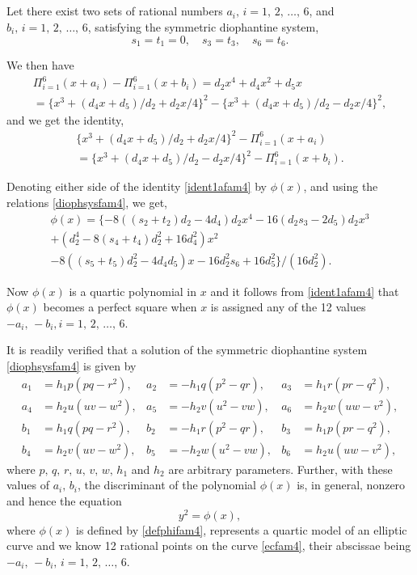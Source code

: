 \documentclass[11pt, leqno]{article}
\begin{document}
\subsection{}
Let  there exist two sets of rational numbers $a_i,\,i=1,\,2,\,\ldots,\,6$, and $b_i,\,i=1,\,2,\,\ldots,\,6$, satisfying the symmetric diophantine system,
\begin{equation}
s_1=t_1=0,\quad s_3=t_3, \quad s_6=t_6. \label{diophsysfam4}
\end{equation}

We then have
\begin{multline}
\Pi_{i=1}^6(x+a_i)-\Pi_{i=1}^6(x+b_i)=d_2x^4+d_4x^2+d_5x\\
=\{x^3+(d_4x+d_5)/d_2+d_2x/4\}^2-\{x^3+(d_4x+d_5)/d_2-d_2x/4\}^2,\label{ident1fam4}
\end{multline}
and we get the identity,
\begin{multline}
\{x^3+(d_4x+d_5)/d_2+d_2x/4\}^2-\Pi_{i=1}^6(x+a_i)\\
=\{x^3+(d_4x+d_5)/d_2-d_2x/4\}^2-\Pi_{i=1}^6(x+b_i).\label{ident1afam4}
\end{multline}

Denoting either side of the identity \eqref{ident1afam4} by $\phi(x)$, and using the relations \eqref{diophsysfam4}, we get,
\begin{multline}
\phi(x)=\{-8((s_2+t_2)d_2-4d_4)d_2x^4-16(d_2s_3-2d_5)d_2x^3\\
+(d_2^4-8(s_4+t_4)d_2^2+16d_4^2)x^2 \quad \\
-8((s_5+t_5)d_2^2-4d_4d_5)x-16d_2^2s_6+16d_5^2\}/(16d_2^2). \label{defphifam4}
\end{multline}

Now $\phi(x)$ is a quartic polynomial in $x$ and it follows from \eqref{ident1afam4} that $\phi(x)$ becomes a perfect square when $x$ is assigned any of the 12 values $-a_i, \, -b_i, i=1,\,2,\,\ldots,\,6$.

It is readily verified that a solution of the symmetric diophantine system \eqref{diophsysfam4} is given by 
\begin{equation}
\begin{aligned}
a_1 &= h_1p(pq-r^2),  & a_2 &= -h_1q(p^2-qr),  & a_3 &= h_1r(pr-q^2),   \\
a_4 &= h_2u(uv-w^2),  & a_5 &= -h_2v(u^2-vw),  & a_6 &= h_2w(uw-v^2),  \\
b_1 &= h_1q(pq-r^2),  & b_2 &= -h_1r(p^2-qr),  & b_3 &= h_1p(pr-q^2),  \\
 b_4 &= h_2v(uv-w^2),  & b_5 &= -h_2w(u^2-vw),  & b_6 &= h_2u(uw-v^2),  
\end{aligned} \label{valabfam4}
\end{equation}
where $p,\,q,\,r,\,u,\,v,\,w,\,h_1$ and $h_2$ are arbitrary parameters. Further, with these values of $a_i, \,b_i$, the discriminant of the polynomial $\phi(x)$ is, in general, nonzero and hence the equation
\begin{equation}
y^2=\phi(x), \label{ecfam4}
\end{equation}
where $\phi(x)$ is defined by \eqref{defphifam4}, represents a quartic model of an elliptic curve and we know 12 rational points on the curve \eqref{ecfam4}, their  abscissae being $-a_i,\,-b_i,\,i=1,\,2,\,\ldots,\,6$.
\end{document}
